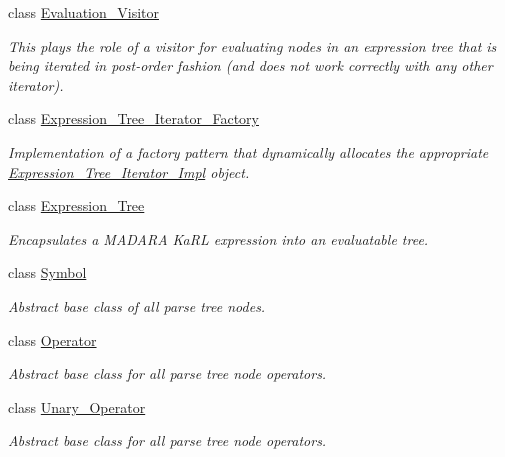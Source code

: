 \begin{DoxyCompactItemize}
class \hyperlink{classMadara_1_1Expression__Tree_1_1Evaluation__Visitor}{Evaluation\_\-Visitor}
\begin{DoxyCompactList}\small\item\em This plays the role of a visitor for evaluating nodes in an expression tree that is being iterated in post-\/order fashion (and does not work correctly with any other iterator). \item\end{DoxyCompactList}\item 
class \hyperlink{classMadara_1_1Expression__Tree_1_1Expression__Tree__Iterator__Factory}{Expression\_\-Tree\_\-Iterator\_\-Factory}
\begin{DoxyCompactList}\small\item\em Implementation of a factory pattern that dynamically allocates the appropriate {\itshape \hyperlink{classMadara_1_1Expression__Tree_1_1Expression__Tree__Iterator__Impl}{Expression\_\-Tree\_\-Iterator\_\-Impl}\/} object. \item\end{DoxyCompactList}\item 
class \hyperlink{classMadara_1_1Expression__Tree_1_1Expression__Tree}{Expression\_\-Tree}
\begin{DoxyCompactList}\small\item\em Encapsulates a MADARA KaRL expression into an evaluatable tree. \item\end{DoxyCompactList}\item 
class \hyperlink{classMadara_1_1Expression__Tree_1_1Symbol}{Symbol}
\begin{DoxyCompactList}\small\item\em Abstract base class of all parse tree nodes. \item\end{DoxyCompactList}\item 
class \hyperlink{classMadara_1_1Expression__Tree_1_1Operator}{Operator}
\begin{DoxyCompactList}\small\item\em Abstract base class for all parse tree node operators. \item\end{DoxyCompactList}\item 
class \hyperlink{classMadara_1_1Expression__Tree_1_1Unary__Operator}{Unary\_\-Operator}
\begin{DoxyCompactList}\small\item\em Abstract base class for all parse tree node operators. \item\end{DoxyCompactList}\item 

\end{DoxyCompactItemize}

